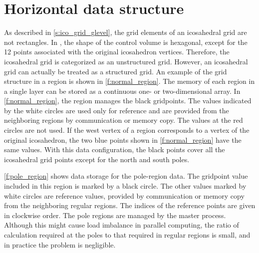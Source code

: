 \section{Horizontal data structure}\label{s:horiz_data_structure}


As described in \autoref{s:ico_grid_glevel}, the grid elements of an
icosahedral grid are not rectangles.
%
In \NICAM, the shape of the control volume is hexagonal, except for the 12 points
associated with the original icosahedron vertices.
%
Therefore, the icosahedral grid is categorized as an unstructured
grid.
%
However, an icosahedral grid can actually be treated as a structured grid.
%
An example of the grid structure in a region is shown in \autoref{f:normal_region}.
%
The memory of each region in a single layer can be stored as a continuous one- or two-dimensional array.
%
In \autoref{f:normal_region}, the region manages the black gridpoints.
%
The values indicated by the white circles are used only for reference
and are provided from the neighboring regions by communication or memory
copy.
%
The values at the red circles are not used.
%
If the west vertex of a region corresponds to a vertex of the original
icosahedron, the two blue points shown in \autoref{f:normal_region}
have the same values.
%
With this data configuration, the black points cover all the icosahedral
grid points except for the north and south poles.

\autoref{f:pole_region} shows data storage for the pole-region
data.
%
The gridpoint value included in this region is marked by a black
circle.
%
The other values marked by white circles are reference values, provided
by communication or memory copy from the neighboring regular regions.
%
The indices of the reference points are given in clockwise order.
%
The pole regions are managed by the master process.
%
Although this might cause load imbalance in parallel computing, the
ratio of calculation required at the poles to that required in regular
regions is small, and in practice the problem is negligible.

